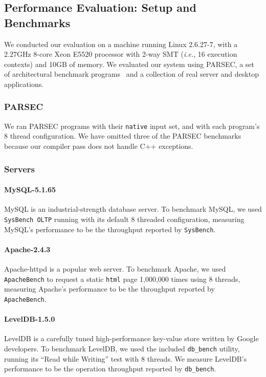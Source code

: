 \documentclass[preprint,9pt]{sigplanconf}
\begin{document}
\subsection{Performance Evaluation: Setup and Benchmarks}

We conducted our evaluation on a machine running Linux 2.6.27-7, with a 2.27GHz
8-core Xeon E5520 processor with 2-way SMT ({\em i.e.}, 16 execution contexts)
and 10GB of memory.  We evaluated our system using PARSEC, a set of
architectural benchmark programs~\cite{parsec} and a collection of real server
and desktop applications.    

\subsubsection{PARSEC}

We ran PARSEC programs with their {\tt native} input set, and with each
program's 8 thread configuration. We have omitted three of the PARSEC
benchmarks because our compiler pass does not handle C++ exceptions.    

\subsubsection{Servers}


\paragraph{MySQL-5.1.65} MySQL is an industrial-strength database
server. To benchmark MySQL, we used {\tt SysBench OLTP} running with its
default 8 threaded configuration, measuring MySQL's performance to be the
throughput reported by {\tt SysBench}.  

\paragraph{Apache-2.4.3} 
Apache-httpd is a popular web server.  To benchmark Apache, we used {\tt
ApacheBench} to request a static {\tt html} page 1,000,000 times using 8
threads, measuring Apache's performance to be the throughput reported by {\tt
ApacheBench}.  

\paragraph{LevelDB-1.5.0}
LevelDB is a carefully tuned high-performance key-value store written by Google
developers. To benchmark LevelDB, we used the included {\tt db\_bench} utility,
running its ``Read while Writing'' test with 8 threads.  We measure LevelDB's
performance to be the operation throughput reported by {\tt db\_bench}.
\end{document}
